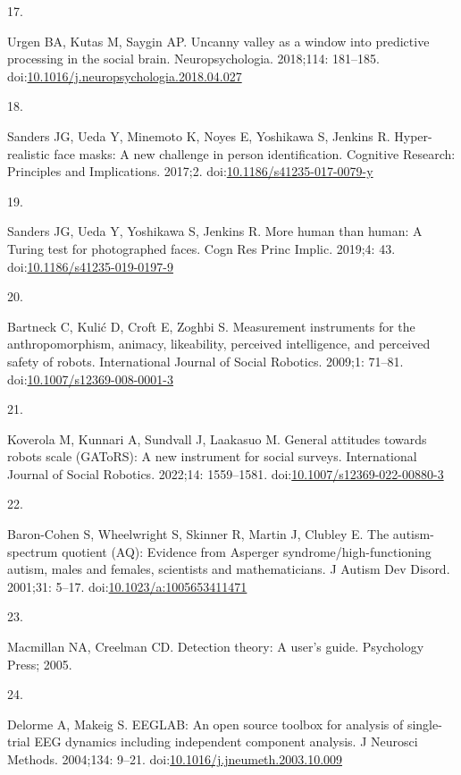 \documentclass[
]{article}
\newlength{\cslhangindent}
\newlength{\csllabelwidth}
\newenvironment{CSLReferences}[2] %
 {\begin{list}{}{%
  \setlength{\itemindent}{0pt}
  \setlength{\leftmargin}{0pt}
  \setlength{\parsep}{0pt}
  \ifodd #1
   \setlength{\leftmargin}{\cslhangindent}
   \setlength{\itemindent}{-1\cslhangindent}
  \fi
  \setlength{\itemsep}{#2\baselineskip}}}
 {\end{list}}
\newcommand{\CSLLeftMargin}[1]{\parbox[t]{\csllabelwidth}{\strut#1\strut}}
\newcommand{\CSLRightInline}[1]{\parbox[t]{\linewidth - \csllabelwidth}{\strut#1\strut}}
\begin{document}
\begin{CSLReferences}{0}{1}
\CSLLeftMargin{17. }%
\CSLRightInline{Urgen BA, Kutas M, Saygin AP. Uncanny valley as a window into predictive processing in the social brain. Neuropsychologia. 2018;114: 181--185. doi:\href{https://doi.org/10.1016/j.neuropsychologia.2018.04.027}{10.1016/j.neuropsychologia.2018.04.027}}

\CSLLeftMargin{18. }%
\CSLRightInline{Sanders JG, Ueda Y, Minemoto K, Noyes E, Yoshikawa S, Jenkins R. Hyper-realistic face masks: A new challenge in person identification. Cognitive Research: Principles and Implications. 2017;2. doi:\href{https://doi.org/10.1186/s41235-017-0079-y}{10.1186/s41235-017-0079-y}}

\CSLLeftMargin{19. }%
\CSLRightInline{Sanders JG, Ueda Y, Yoshikawa S, Jenkins R. More human than human: A {Turing} test for photographed faces. Cogn Res Princ Implic. 2019;4: 43. doi:\href{https://doi.org/10.1186/s41235-019-0197-9}{10.1186/s41235-019-0197-9}}

\CSLLeftMargin{20. }%
\CSLRightInline{Bartneck C, Kulić D, Croft E, Zoghbi S. Measurement instruments for the anthropomorphism, animacy, likeability, perceived intelligence, and perceived safety of robots. International Journal of Social Robotics. 2009;1: 71--81. doi:\href{https://doi.org/10.1007/s12369-008-0001-3}{10.1007/s12369-008-0001-3}}

\CSLLeftMargin{21. }%
\CSLRightInline{Koverola M, Kunnari A, Sundvall J, Laakasuo M. General attitudes towards robots scale (GAToRS): A new instrument for social surveys. International Journal of Social Robotics. 2022;14: 1559--1581. doi:\href{https://doi.org/10.1007/s12369-022-00880-3}{10.1007/s12369-022-00880-3}}

\CSLLeftMargin{22. }%
\CSLRightInline{Baron-Cohen S, Wheelwright S, Skinner R, Martin J, Clubley E. The autism-spectrum quotient (AQ): Evidence from {Asperger} syndrome/high-functioning autism, males and females, scientists and mathematicians. J Autism Dev Disord. 2001;31: 5--17. doi:\href{https://doi.org/10.1023/a:1005653411471}{10.1023/a:1005653411471}}

\CSLLeftMargin{23. }%
\CSLRightInline{Macmillan NA, Creelman CD. Detection theory: A user's guide. Psychology Press; 2005. }

\CSLLeftMargin{24. }%
\CSLRightInline{Delorme A, Makeig S. {EEGLAB}: An open source toolbox for analysis of single-trial {EEG} dynamics including independent component analysis. J Neurosci Methods. 2004;134: 9--21. doi:\href{https://doi.org/10.1016/j.jneumeth.2003.10.009}{10.1016/j.jneumeth.2003.10.009}}


\end{CSLReferences}
\end{document}
